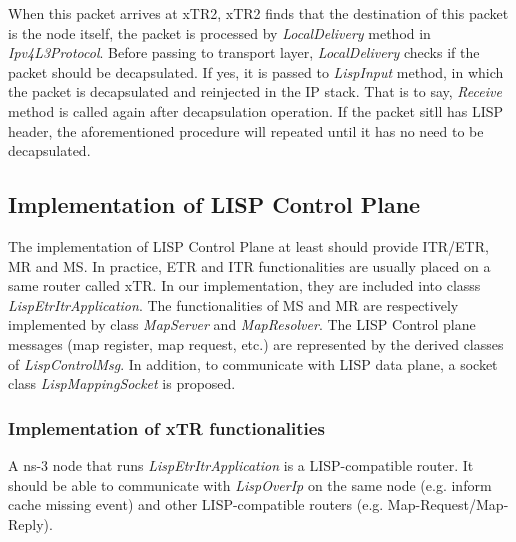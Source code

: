 When this packet arrives at xTR2, xTR2 finds that the destination of this packet is the node itself, the packet is processed by \emph{LocalDelivery} method in \emph{Ipv4L3Protocol}. Before passing to transport layer, \emph{LocalDelivery} checks if the packet should be decapsulated. If yes, it is passed to \emph{LispInput} method, in which the packet is decapsulated and reinjected in the IP stack. That is to say, \emph{Receive} method is called again after decapsulation operation. If the packet sitll has LISP header, the aforementioned procedure will repeated until it has no need to be decapsulated.

\subsection{Implementation of LISP Control Plane}
\label{subsec:control-plane-impl}
The implementation of LISP Control Plane at least should provide ITR/ETR, MR and MS. In practice, ETR and ITR functionalities are usually placed on a same router called xTR. In our implementation, they are included into classs \emph{LispEtrItrApplication}.
The functionalities of MS and MR are respectively implemented by class \emph{MapServer} and \emph{MapResolver}. The LISP Control plane messages (map register, map request, etc.) are represented by the derived classes of \emph{LispControlMsg}. In addition, to communicate with LISP data plane, a socket class \emph{LispMappingSocket} is proposed.

\subsubsection{Implementation of xTR functionalities}
 A ns-3 node that runs \emph{LispEtrItrApplication} is a LISP-compatible router. It should be able to communicate with \emph{LispOverIp} on the same node (e.g. inform cache missing event) and other LISP-compatible routers (e.g. Map-Request/Map-Reply). 

